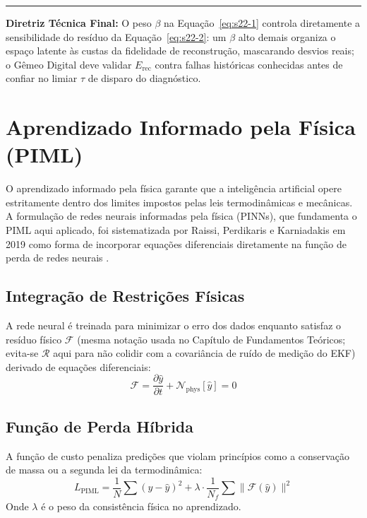 \documentclass[12pt,a4paper]{article}
\numberwithin{equation}{section}
\numberwithin{table}{section}
\numberwithin{figure}{section}
\begin{document}
	\vspace{1em}
	\hrule
	\vspace{1em}

	\textbf{Diretriz Técnica Final:} O peso $\beta$ na Equação~\eqref{eq:s22-1} controla diretamente a sensibilidade do resíduo da Equação~\eqref{eq:s22-2}: um $\beta$ alto demais organiza o espaço latente às custas da fidelidade de reconstrução, mascarando desvios reais; o Gêmeo Digital deve validar $E_{\text{rec}}$ contra falhas históricas conhecidas antes de confiar no limiar $\tau$ de disparo do diagnóstico.

	\section{Aprendizado Informado pela Física (PIML)}

	O aprendizado informado pela física garante que a inteligência artificial opere estritamente dentro dos limites impostos pelas leis termodinâmicas e mecânicas. A formulação de redes neurais informadas pela física (PINNs), que fundamenta o PIML aqui aplicado, foi sistematizada por Raissi, Perdikaris e Karniadakis em 2019 como forma de incorporar equações diferenciais diretamente na função de perda de redes neurais \cite{piml}.
	
	\subsection{Integração de Restrições Físicas}
	A rede neural é treinada para minimizar o erro dos dados enquanto satisfaz o resíduo físico $\mathcal{F}$ (mesma notação usada no Capítulo de Fundamentos Teóricos; evita-se $\mathcal{R}$ aqui para não colidir com a covariância de ruído de medição do EKF) derivado de equações diferenciais:
	\begin{equation}\label{eq:s23-1}
 \mathcal{F} = \frac{\partial \hat{y}}{\partial t} + \mathcal{N}_{\text{phys}}[\hat{y}] = 0
\end{equation}

	\subsection{Função de Perda Híbrida}
	A função de custo penaliza predições que violam princípios como a conservação de massa ou a segunda lei da termodinâmica:
	\begin{equation}\label{eq:s23-2}
 L_{\text{PIML}} = \frac{1}{N} \sum (y - \hat{y})^2 + \lambda \cdotp \frac{1}{N_f} \sum \| \mathcal{F}(\hat{y}) \|^2
\end{equation}
	Onde $\lambda$ é o peso da consistência física no aprendizado.
\end{document}
